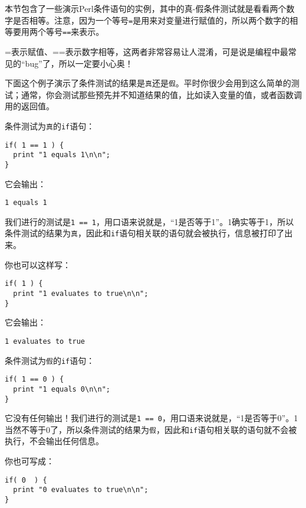 本节包含了一些演示Perl条件语句的实例，其中的真-假条件测试就是看看两个数字是否相等。注意，因为一个等号\verb|=|是用来对变量进行赋值的，所以两个数字的相等要用两个等号\verb|==|来表示。

\begin{adjustwidth}{2cm}{2cm}
\noindent
=表示赋值、==表示数字相等，这两者非常容易让人混淆，可是说是编程中最常见的“bug”了，所以一定要小心奥！
\end{adjustwidth}

下面这个例子演示了条件测试的结果是\verb|真|还是\verb|假|。平时你很少会用到这么简单的测试；通常，你会测试那些预先并不知道结果的值，比如读入变量的值，或者函数调用的返回值。

条件测试为\verb|真|的\verb|if|语句：

\begin{lstlisting}
if( 1 == 1 ) {
  print "1 equals 1\n\n";
}
\end{lstlisting}

它会输出：

\begin{lstlisting}
1 equals 1
\end{lstlisting}

我们进行的测试是\verb|1 == 1|，用口语来说就是，“1是否等于1”。1确实等于1，所以条件测试的结果为\verb|真|，因此和\verb|if|语句相关联的语句就会被执行，信息被打印了出来。

你也可以这样写：

\begin{lstlisting}
if( 1 ) {
  print "1 evaluates to true\n\n";
}
\end{lstlisting}

它会输出：

\begin{lstlisting}
1 evaluates to true
\end{lstlisting}

条件测试为\verb|假|的\verb|if|语句：

\begin{lstlisting}
if( 1 == 0 ) {
  print "1 equals 0\n\n";
}
\end{lstlisting}

它没有任何输出！我们进行的测试是\verb|1 == 0|，用口语来说就是，“1是否等于0”。1当然不等于0了，所以条件测试的结果为\verb|假|，因此和\verb|if|语句相关联的语句就不会被执行，不会输出任何信息。

你也可写成：

\begin{lstlisting}
if( 0  ) {
  print "0 evaluates to true\n\n";
}
\end{lstlisting}

